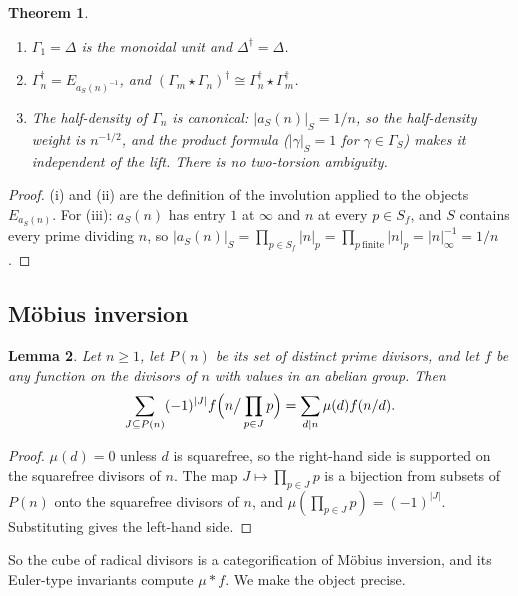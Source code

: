\documentclass[11pt]{amsart}
\newtheorem{theorem}{Theorem}[section]
\newtheorem{lemma}[theorem]{Lemma}
\theoremstyle{definition}
\theoremstyle{remark}
\begin{document}
\begin{theorem}\label{thm:unittransphalf}
\begin{enumerate}
\item[(i)] $\Gamma_1=\Delta$ is the monoidal unit and $\Delta^\dagger=\Delta$.
\item[(ii)] $\Gamma_n^\dagger=E_{a_S(n)^{-1}}$, and
$(\Gamma_m\star\Gamma_n)^\dagger\cong\Gamma_n^\dagger\star\Gamma_m^\dagger$.
\item[(iii)] The half-density of $\Gamma_n$ is canonical: $|a_S(n)|_S=1/n$, so
the half-density weight is $n^{-1/2}$, and the product formula
($|\gamma|_S=1$ for $\gamma\in\Gamma_S$) makes it independent of the lift.
There is no two-torsion ambiguity.
\end{enumerate}
\end{theorem}

\begin{proof}
(i) and (ii) are the definition of the involution applied to the objects
$E_{a_S(n)}$. For (iii): $a_S(n)$ has entry $1$ at $\infty$ and $n$ at every
$p\in S_f$, and $S$ contains every prime dividing $n$, so
$|a_S(n)|_S=\prod_{p\in S_f}|n|_p=\prod_{p\ \mathrm{finite}}|n|_p
=|n|_\infty^{-1}=1/n$.
\end{proof}

\subsection{M\"obius inversion}

\begin{lemma}\label{lem:mobiuscube}
Let $n\ge1$, let $P(n)$ be its set of distinct prime divisors, and let $f$ be
any function on the divisors of $n$ with values in an abelian group. Then
\begin{equation}\label{eq:mobiuscube}
  \sum_{J\subseteq P(n)}(-1)^{|J|}f\Bigl(n\big/\prod_{p\in J}p\Bigr)
   =\sum_{d\mid n}\mu(d)f(n/d).
\end{equation}
\end{lemma}

\begin{proof}
$\mu(d)=0$ unless $d$ is squarefree, so the right-hand side is supported on the
squarefree divisors of $n$. The map $J\mapsto\prod_{p\in J}p$ is a bijection
from subsets of $P(n)$ onto the squarefree divisors of $n$, and
$\mu(\prod_{p\in J}p)=(-1)^{|J|}$. Substituting gives the left-hand side.
\end{proof}

So the cube of radical divisors is a categorification of M\"obius inversion,
and its Euler-type invariants compute $\mu*f$. We make the object precise.
\end{document}
